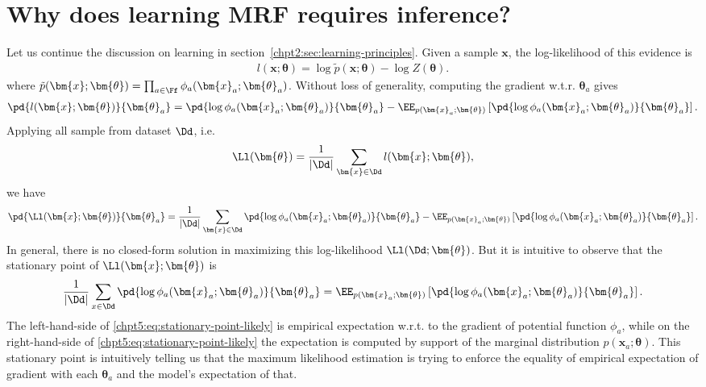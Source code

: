 \section{Why does learning MRF requires inference?}
\label{chpt5:sec:learning-mrf}
Let us continue the discussion on learning in section~\ref{chpt2:sec:learning-principles}. Given a sample $\bm{x}$, the log-likelihood of this evidence is
\begin{align}\label{chpt5:eq:one-sample-likely}
  l(\bm{x};\bm{\theta}) = \log{\tilde{p}(\bm{x}; \bm{\theta})} - \log{Z(\bm{\theta})}.
\end{align}
where $\tilde{p}(\bm{x}; \bm{\theta}) =  \prod_{a\in \Ff} \phi_a(\bm{x}_a; \bm{\theta}_a)$. 
Without loss of generality, computing the gradient w.t.r. $\bm{\theta}_a$ gives
\begin{align}\label{chpt5:eq:one-sample-likely-grad}
  \pd{l(\bm{x};\bm{\theta})}{\bm{\theta}_a} = \pd{\log{{\phi_a}(\bm{x}_a; \bm{\theta}_a)}}{\bm{\theta}_a} - \EE_{p(\bm{x}_a; \bm{\theta})}\left[ \pd{\log{{\phi_a}(\bm{x}_a; \bm{\theta}_a)}}{\bm{\theta}_a} \right].
\end{align}
Applying all sample from dataset $\Dd$, i.e.
\begin{equation}
  \Ll(\bm{\theta}) = \frac{1}{|\Dd |} \sum_{\bm{x} \in \Dd} l(\bm{x}; \bm{\theta}),
\end{equation}
we have
\begin{equation}\label{chpt3:eq:likely-gradient-thetaa}
  \pd{\Ll(\bm{x};\bm{\theta})}{\bm{\theta}_a} = \frac{1}{|\Dd |} \sum_{\bm{x} \in \Dd}\pd{\log{{\phi_a}(\bm{x}_a; \bm{\theta}_a)}}{\bm{\theta}_a} - \EE_{p(\bm{x}_a; \bm{\theta})}\left[ \pd{\log{{\phi_a}(\bm{x}_a; \bm{\theta}_a)}}{\bm{\theta}_a} \right].
\end{equation}
In general, there is no closed-form solution in maximizing this log-likelihood $\Ll(\Dd; \bm{\theta})$. But it is intuitive to observe that the stationary point of ${\Ll(\bm{x};\bm{\theta})}$ is
\begin{equation}\label{chpt5:eq:stationary-point-likely}
  \frac{1}{|\Dd |} \sum_{x \in \Dd}\pd{\log{{\phi_a}(\bm{x}_a; \bm{\theta}_a)}}{\bm{\theta}_a} = \EE_{p(\bm{x}_a; \bm{\theta})}\left[ \pd{\log{{\phi_a}(\bm{x}_a; \bm{\theta}_a)}}{\bm{\theta}_a} \right].
\end{equation}
The left-hand-side of \eqref{chpt5:eq:stationary-point-likely} is empirical expectation w.r.t. to the gradient of potential function $\phi_a$, while on the right-hand-side of \eqref{chpt5:eq:stationary-point-likely} the expectation is computed by support of the marginal distribution $p(\bm{x}_a; \bm{\theta})$. This stationary point is intuitively telling us that the maximum likelihood estimation is trying to enforce the equality of empirical expectation of gradient with each $\bm{\theta}_a$ and the model's expectation of that.
